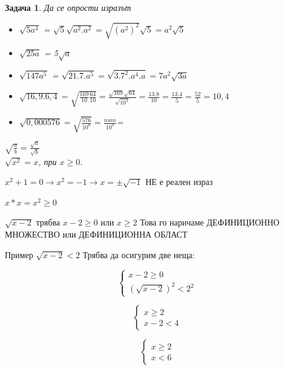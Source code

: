 \documentclass{article}
\newtheorem{problem}{Задача}
\begin{document}
\begin{problem}
	Да се опрости изразът
	\begin{itemize}
		\item $\sqrt{5a^4} $ = $\sqrt{5}\sqrt{a^2.a^2} = \sqrt{ (a^2)^2}\sqrt5 = a^2\sqrt{5}$
		\item  $\sqrt{25a}$ = 5$\sqrt{a}$ 
		\item $\sqrt{147a^5} $ = $\sqrt{21.7.a^5}=\sqrt{3.7^2.a^4.a}= 7a^2\sqrt{3a}$
		\item $\sqrt{16,9.6,4}  = \sqrt{ \frac{169}{10}\frac{64}{10}} = \frac{\sqrt {169} \sqrt {64}}{\sqrt{10^2}} = \frac{13.8}{10} = \frac{13.4}{5} = \frac{52}{5} = 10,4$
		\item $\sqrt {0,000576}  = \sqrt{\frac{576 }{10^6} }=\frac{num}{10^3}$=
	\end{itemize}

$\sqrt {\frac{a}{b}} = \frac{\sqrt a}{\sqrt b} $ \\
$\sqrt{x^2} = x $, при $x \geq0$.

\end{problem}







\newpage
\vspace{1cm}

$x^2 + 1 = 0 \to x^2 = -1 \to x = \pm \sqrt{-1}$ НЕ е реален израз

$x*x = x^2 \geq 0 $ 



\vspace{1cm}


$\sqrt{x -2 } $ \hspace{1cm} трябва $x-2 \geq 0$ или $x \geq 2 $ Това го наричаме ДЕФИНИЦИОННО МНОЖЕСТВО или ДЕФИНИЦИОННА ОБЛАСТ


Пример $\sqrt{x -2 } < 2 $ Трябва да осигурим две неща:

	\[
\begin{cases}
 	x-2 \geq 0 \\
	(\sqrt{x-2})^2 < 2^2 
\end{cases}
\]

	\[
\begin{cases}
	x \geq 2 \\
	x-2 < 4
\end{cases}
\]



\[
\begin{cases}
	x \geq 2 \\
	x < 6
\end{cases}
\]
\end{document}
